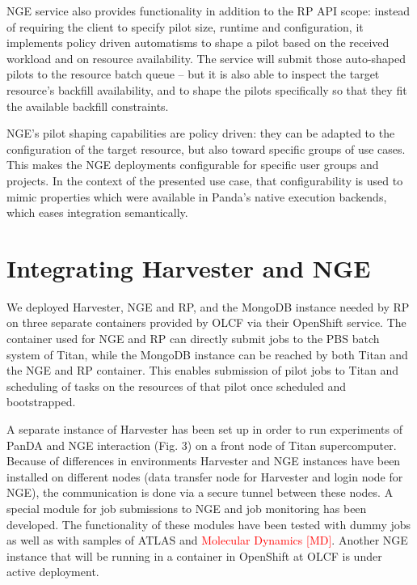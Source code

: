 \documentclass{webofc}
\begin{document}
NGE service also provides functionality in addition to the RP API scope:
instead of requiring the client to specify pilot size, runtime and
configuration, it implements policy driven automatisms to shape a pilot based
on the received workload and on resource availability.  The service will
submit those auto-shaped pilots to the resource batch queue -- but it is also
able to inspect the target resource's backfill availability, and to shape the
pilots specifically so that they fit the available backfill constraints.
	
NGE's pilot shaping capabilities are policy driven: they can be adapted to
the configuration of the target resource, but also toward specific groups of
use cases. This makes the NGE deployments configurable for specific user
groups and projects.  In the context of the presented use case, that
configurability is used to mimic properties which were available in Panda's
native execution backends, which eases integration semantically.


\section{Integrating Harvester and NGE}

We deployed Harvester, NGE and RP, and the MongoDB instance needed by RP on
three separate containers provided by OLCF via their OpenShift service. The
container used for NGE and RP can directly submit jobs to the PBS batch
system of Titan, while the MongoDB instance can be reached by both Titan and
the NGE and RP container. This enables submission of pilot jobs to Titan and
scheduling of tasks on the resources of that pilot once scheduled and
bootstrapped.

A separate instance of Harvester has been set up in order to run experiments
of PanDA and NGE interaction (Fig. 3) on a front node of Titan supercomputer.
Because of differences in environments Harvester and NGE instances have been
installed on different nodes (data transfer node for Harvester and login node
for NGE), the communication is done via a secure tunnel between these nodes.
A special module for job submissions to NGE and job monitoring has been
developed. The functionality of these modules have been tested with dummy
jobs as well as with samples of ATLAS and \textcolor{red}{Molecular Dynamics [MD]}. Another
NGE instance that will be running in a container in OpenShift at OLCF is
under active deployment.
\end{document}
